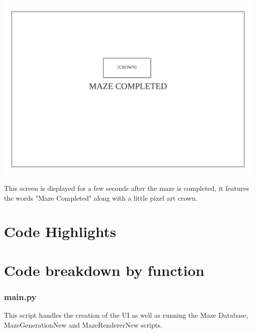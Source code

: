 \documentclass{article}
\begin{document}
\clearpage
\begin{center}
	\includegraphics[scale=0.7]{Maze Completed}

	This screen is displayed for a few seconds after the maze is completed, it features the words "Maze Completed" along with a little pixel art crown.
\end{center}



\clearpage
\part{Code Highlights}
\clearpage

\clearpage
\part{Code breakdown by function}
\clearpage
\section{main.py}
This script handles the creation of the UI as well as running the Maze Database, MazeGenerationNew and 
MazeRendererNew scripts.
\end{document}
